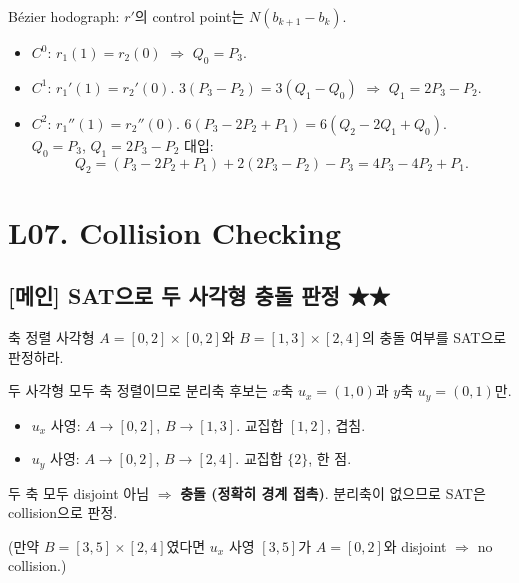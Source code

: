 \documentclass[11pt,a4paper]{article}
\begin{document}
\begin{sol}
Bézier hodograph: $r'$의 control point는 $N(b_{k+1} - b_k)$.

\begin{itemize}
  \item $C^0$: $r_1(1) = r_2(0)$ $\Rightarrow$ $\boxed{Q_0 = P_3}$.
  \item $C^1$: $r_1'(1) = r_2'(0)$. $3(P_3 - P_2) = 3(Q_1 - Q_0)$ $\Rightarrow$ $\boxed{Q_1 = 2P_3 - P_2}$.
  \item $C^2$: $r_1''(1) = r_2''(0)$. $6(P_3 - 2P_2 + P_1) = 6(Q_2 - 2Q_1 + Q_0)$.\\
  $Q_0 = P_3$, $Q_1 = 2P_3 - P_2$ 대입:
  \[
  Q_2 = (P_3 - 2P_2 + P_1) + 2(2P_3 - P_2) - P_3 = \boxed{4P_3 - 4P_2 + P_1}.
  \]
\end{itemize}
\end{sol}

\section{L07. Collision Checking}

\subsection*{[메인] SAT으로 두 사각형 충돌 판정 \hfill ★★}

\begin{prob}
축 정렬 사각형 $A = [0, 2] \times [0, 2]$와 $B = [1, 3] \times [2, 4]$의 충돌 여부를 SAT으로 판정하라.
\end{prob}

\begin{sol}
두 사각형 모두 축 정렬이므로 분리축 후보는 $x$축 $u_x = (1, 0)$과 $y$축 $u_y = (0, 1)$만.

\begin{itemize}
  \item $u_x$ 사영: $A \to [0, 2]$, $B \to [1, 3]$. 교집합 $[1, 2]$, 겹침.
  \item $u_y$ 사영: $A \to [0, 2]$, $B \to [2, 4]$. 교집합 $\{2\}$, 한 점.
\end{itemize}

두 축 모두 disjoint 아님 $\Rightarrow$ \textbf{충돌 (정확히 경계 접촉)}. 분리축이 없으므로 SAT은 collision으로 판정.

(만약 $B = [3, 5] \times [2, 4]$였다면 $u_x$ 사영 $[3, 5]$가 $A = [0, 2]$와 disjoint $\Rightarrow$ no collision.)
\end{sol}
\end{document}
